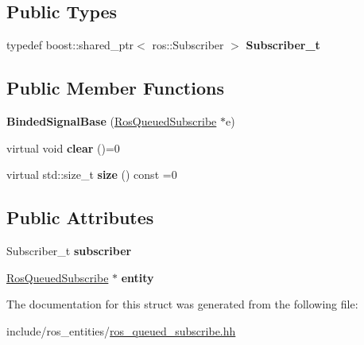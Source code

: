 \subsection*{Public Types}
\begin{DoxyCompactItemize}
\item 
typedef boost\+::shared\+\_\+ptr$<$ ros\+::\+Subscriber $>$ {\bfseries Subscriber\+\_\+t}\hypertarget{structdynamic__graph_1_1internal_1_1BindedSignalBase_a1933d9d9542b368db7cc0bfb9f815aca}{}\label{structdynamic__graph_1_1internal_1_1BindedSignalBase_a1933d9d9542b368db7cc0bfb9f815aca}

\end{DoxyCompactItemize}
\subsection*{Public Member Functions}
\begin{DoxyCompactItemize}
\item 
{\bfseries Binded\+Signal\+Base} (\hyperlink{classdynamic__graph_1_1RosQueuedSubscribe}{Ros\+Queued\+Subscribe} $\ast$e)\hypertarget{structdynamic__graph_1_1internal_1_1BindedSignalBase_a26dec102614700c0ee2e7ad82dade3fe}{}\label{structdynamic__graph_1_1internal_1_1BindedSignalBase_a26dec102614700c0ee2e7ad82dade3fe}

\item 
virtual void {\bfseries clear} ()=0\hypertarget{structdynamic__graph_1_1internal_1_1BindedSignalBase_a65e4a7c402753871fb2b6ca25a4f7b04}{}\label{structdynamic__graph_1_1internal_1_1BindedSignalBase_a65e4a7c402753871fb2b6ca25a4f7b04}

\item 
virtual std\+::size\+\_\+t {\bfseries size} () const =0\hypertarget{structdynamic__graph_1_1internal_1_1BindedSignalBase_acd1d899c6da6c8837f1df5c257d13169}{}\label{structdynamic__graph_1_1internal_1_1BindedSignalBase_acd1d899c6da6c8837f1df5c257d13169}

\end{DoxyCompactItemize}
\subsection*{Public Attributes}
\begin{DoxyCompactItemize}
\item 
Subscriber\+\_\+t {\bfseries subscriber}\hypertarget{structdynamic__graph_1_1internal_1_1BindedSignalBase_ad02d78850a029fc9296536a85c414ccb}{}\label{structdynamic__graph_1_1internal_1_1BindedSignalBase_ad02d78850a029fc9296536a85c414ccb}

\item 
\hyperlink{classdynamic__graph_1_1RosQueuedSubscribe}{Ros\+Queued\+Subscribe} $\ast$ {\bfseries entity}\hypertarget{structdynamic__graph_1_1internal_1_1BindedSignalBase_ad755497fd34b1e59650bc290150ff931}{}\label{structdynamic__graph_1_1internal_1_1BindedSignalBase_ad755497fd34b1e59650bc290150ff931}

\end{DoxyCompactItemize}


The documentation for this struct was generated from the following file\+:\begin{DoxyCompactItemize}
\item 
include/ros\+\_\+entities/\hyperlink{ros__queued__subscribe_8hh}{ros\+\_\+queued\+\_\+subscribe.\+hh}\end{DoxyCompactItemize}
